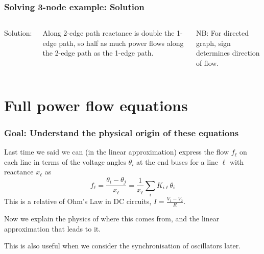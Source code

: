 \documentclass[10pt,aspectratio=169,dvipsnames]{beamer}
\begin{document}
\begin{frame}
  \frametitle{Solving 3-node example: Solution}

  \vspace{.3cm}

  \begin{columns}


  Solution:
  \vspace{.3cm}

    \centering

  \raggedright


      Along 2-edge path reactance is double the 1-edge path, so half as much power flows along the 2-edge path as the 1-edge path.

      \vspace{.5cm}
  NB: For directed graph, sign determines direction of flow.

  \end{columns}
\end{frame}




\section{Full power flow equations}


\begin{frame}
  \frametitle{Goal: Understand the physical origin of these equations}

  Last time we said we can (in the linear approximation) express the
  flow $f_\ell$ on each line in terms of the voltage angles $\theta_i$
  at the end buses for a line $\ell$ with
  reactance $x_\ell$ as
  \begin{equation*}
    f_\ell = \frac{\theta_i - \theta_j}{x_\ell} = \frac{1}{x_\ell}\sum_{i} K_{i\ell} \theta_i
  \end{equation*}
   This is a relative of Ohm's Law in DC circuits, $I = \frac{V_1 - V_2}{R}$.


  Now we explain the physics of where this comes from, and the linear approximation
  that leads to it.

  This is also useful when we consider the synchronisation of
  oscillators later.
\end{frame}
\end{document}
